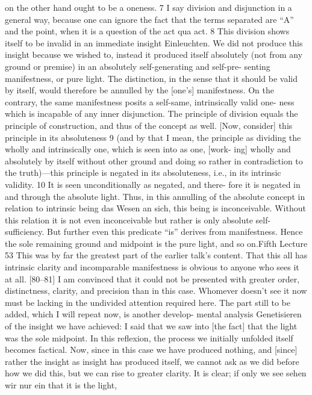 on the other hand ought to be a oneness. 7 I say division and disjunction in a
general way, because one can ignore the fact that the terms separated are “A”
and the point, when it is a question of the act qua act. 8 This division shows
itself to be invalid in an immediate insight {Einleuchten}. We did not produce
this insight because we wished to, instead it produced itself absolutely (not
from any ground or premise) in an absolutely self-generating and self-pre-
senting manifestness, or pure light. The distinction, in the sense that it should
be valid by itself, would therefore be annulled by the [one’s] manifestness. On
the contrary, the same manifestness posits a self-same, intrinsically valid one-
ness which is incapable of any inner disjunction. The principle of division
equals the principle of construction, and thus of the concept as well. [Now,
consider] this principle in its absoluteness 9 (and by that I mean, the principle
as dividing the wholly and intrinsically one, which is seen into as one, [work-
ing] wholly and absolutely by itself without other ground and doing so rather
in contradiction to the truth)—this principle is negated in its absoluteness,
i.e., in its intrinsic validity. 10 It is seen unconditionally as negated, and there-
fore it is negated in and through the absolute light. Thus, in this annulling of
the absolute concept in relation to intrinsic being {das Wesen an sich}, this being
is inconceivable. Without this relation it is not even inconceivable but rather is
only absolute self-sufficiency. But further even this predicate “is” derives from
manifestness. Hence the sole remaining ground and midpoint is the pure light,
and so on.Fifth Lecture
53
This was by far the greatest part of the earlier talk’s content. That this
all has intrinsic clarity and incomparable manifestness is obvious to anyone
who sees it at all. [80–81] I am convinced that it could not be presented with
greater order, distinctness, clarity, and precision than in this case. Whomever
doesn’t see it now must be lacking in the undivided attention required here.
The part still to be added, which I will repeat now, is another develop-
mental analysis {Genetisieren} of the insight we have achieved: I said that we
saw into [the fact] that the light was the sole midpoint. In this reflexion, the
process we initially unfolded itself becomes factical. Now, since in this case we
have produced nothing, and [since] rather the insight as insight has produced
itself, we cannot ask as we did before how we did this, but we can rise to
greater clarity. It is clear; if only we see {sehen wir nur ein} that it is the light,
